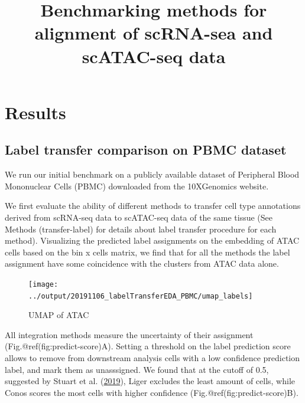 \documentclass[]{article}
\title{Benchmarking methods for alignment of scRNA-sea and scATAC-seq data}
\author{}
\date{}
\begin{document}
\maketitle

\hypertarget{results}{%
\section{Results}\label{results}}

\hypertarget{label-transfer-comparison-on-pbmc-dataset}{%
\subsection{Label transfer comparison on PBMC
dataset}\label{label-transfer-comparison-on-pbmc-dataset}}

We run our initial benchmark on a publicly available dataset of
Peripheral Blood Mononuclear Cells (PBMC) downloaded from the
10XGenomics website.

We first evaluate the ability of different methods to transfer cell type
annotations derived from scRNA-seq data to scATAC-seq data of the same
tissue (See Methods (transfer-label) for details about label
transfer procedure for each method). Visualizing the predicted label
assignments on the embedding of ATAC cells based on the bin x cells
matrix, we find that for all the methods the label assignment have some
coincidence with the clusters from ATAC data alone.

\begin{figure}
\texttt{[image: ../output/20191106\_labelTransferEDA\_PBMC/umap\_labels]} \caption{UMAP of ATAC}\label{fig:label-transfer-umap}
\end{figure}

All integration methods measure the uncertainty of their assignment
(Fig.@ref(fig:predict-score)A). Setting a threshold on the label
prediction score allows to remove from downstream analysis cells with a
low confidence prediction label, and mark them as unasssigned. We found
that at the cutoff of 0.5, suggested by Stuart et al.
(\protect\hyperlink{ref-stuartComprehensiveIntegrationSingleCell2019a}{2019}),
Liger excludes the least amount of cells, while Conos scores the most
cells with higher confidence (Fig.@ref(fig:predict-score)B).
\end{document}

